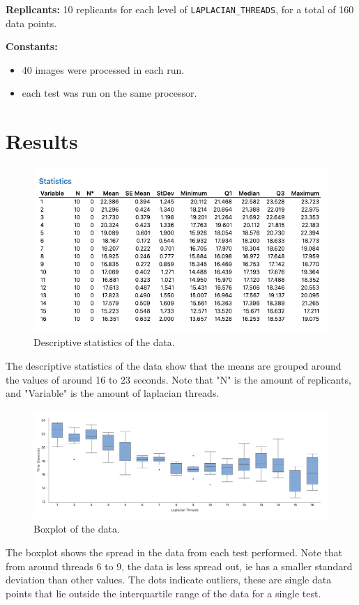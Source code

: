 \documentclass{article}
\begin{document}
\begin{flushleft}
  \textbf{Replicants:} 10 replicants for each level of \texttt{LAPLACIAN\_THREADS}, for a total of 160 data points. \\
\end{flushleft}

\begin{flushleft}
  \textbf{Constants:}
  \begin{itemize}
    \item 40 images were processed in each run.
    \item each test was run on the same processor.
  \end{itemize}
\end{flushleft}

\clearpage
\section*{Results}
\begin{figure}[h]
  \centering
  \includegraphics[width=1\textwidth]{./images/3.png}
  \caption{Descriptive statistics of the data.}
  \label{fig:3_b_2}
\end{figure}

The descriptive statistics of the data show that the means are grouped around the values of around 16 to 23 seconds.
Note that "N" is the amount of replicants, and "Variable" is the amount of laplacian threads.

\begin{figure}[h]
  \centering
  \includegraphics[width=1\textwidth]{./images/2.png}
  \caption{Boxplot of the data.}
  \label{fig:3_b_2}
\end{figure}
The boxplot shows the spread in the data from each test performed. Note that from around threads 6 to 9, the data is less spread out, ie has a smaller standard deviation than other values.
The dots indicate outliers, these are single data points that lie outside the interquartile range of the data for a single test.
\end{document}
